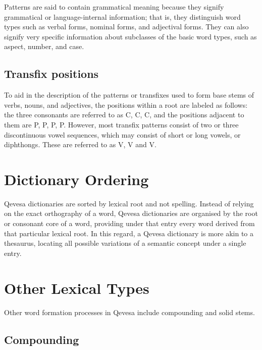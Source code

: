 \documentclass[grammar]{subfiles}
\begin{document}
  Patterns are said to contain grammatical meaning because they signify
  grammatical or language-internal information; that is, they distinguish word
  types such as verbal forms, nominal forms, and adjectival forms.  They can
  also signify very specific information about subclasses of the basic word
  types, such as aspect, number, and case.

  \subsection{Transfix positions}
  \label{ssec:mt_transfix_positions}

  To aid in the description of the patterns or transfixes used to form base
  stems of verbs, nouns, and adjectives, the positions within a root are
  labeled as follows: the three consonants are referred to as C, C,
  C, and the positions adjacent to them are P, P, P,
  P.  However, most transfix patterns consist of two or three
  discontinuous vowel sequences, which may consist of short or long vowels, or
  diphthongs.  These are referred to as V, V and V. 

  \section{Dictionary Ordering}
  \label{sec:mt_dictionary_ordering}

  Qevesa dictionaries are sorted by lexical root and not spelling.  Instead of
  relying on the exact orthography of a word, Qevesa dictionaries are organised
  by the root or consonant core of a word, providing under that entry every
  word derived from that particular lexical root.  In this regard, a Qevesa
  dictionary is more akin to a thesaurus, locating all possible variations of a
  semantic concept under a single entry.

  \section{Other Lexical Types}
  \label{sec:mt_other_lexical_types}

  Other word formation processes in Qevesa include compounding and solid stems.

  \subsection{Compounding}
  \label{ssec:mt_morph_compounding}
\end{document}
